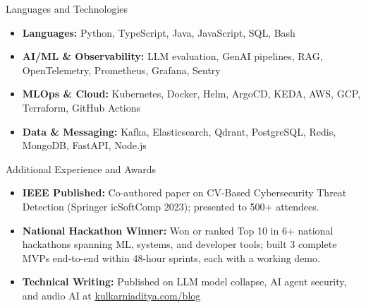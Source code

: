 \documentclass[]{mcdowellcv}
\begin{document}
\begin{cvsection}{Languages and Technologies}
  \begin{cvsubsection}{}{}{}
    \begin{itemize}
      \item \textbf{Languages:} Python, TypeScript, Java, JavaScript, SQL, Bash
      \item \textbf{AI/ML \& Observability:} LLM evaluation, GenAI pipelines, RAG, OpenTelemetry, Prometheus, Grafana, Sentry
      \item \textbf{MLOps \& Cloud:} Kubernetes, Docker, Helm, ArgoCD, KEDA, AWS, GCP, Terraform, GitHub Actions
      \item \textbf{Data \& Messaging:} Kafka, Elasticsearch, Qdrant, PostgreSQL, Redis, MongoDB, FastAPI, Node.js
    \end{itemize}
  \end{cvsubsection}
\end{cvsection}

\begin{cvsection}{Additional Experience and Awards}
  \begin{cvsubsection}{}{}{}
    \begin{itemize}
      \item \textbf{IEEE Published:} Co-authored paper on CV-Based Cybersecurity Threat Detection (Springer icSoftComp 2023); presented to 500+ attendees.
      \item \textbf{National Hackathon Winner:} Won or ranked Top 10 in 6+ national hackathons spanning ML, systems, and developer tools; built 3 complete MVPs end-to-end within 48-hour sprints, each with a working demo.
      \item \textbf{Technical Writing:} Published on LLM model collapse, AI agent security, and audio AI at \href{https://www.kulkarniaditya.com/blog}{kulkarniaditya.com/blog}
    \end{itemize}
  \end{cvsubsection}
\end{cvsection}
\end{document}
